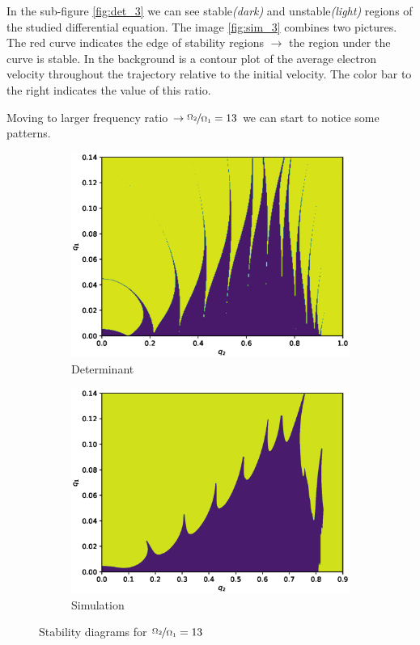 In the sub-figure \ref{fig:det_3} we can see stable\textit{(dark)} and unstable\textit{(light)} regions of the studied differential equation. The image \ref{fig:sim_3} combines two pictures. The red curve indicates the edge of stability regions $\rightarrow$ the region under the curve is stable. In the background is a contour plot of the average electron velocity throughout the trajectory relative to the initial velocity. The color bar to the right indicates the value of this ratio.

Moving to larger frequency ratio $\rightarrow \nicefrac{\Omega_2}{\Omega_1} = 13$ we can start to notice some patterns.

\begin{figure}[H]
\begin{subfigure}{.5\textwidth}
  \centering
  \includegraphics[width=\linewidth]{img/q1_0.0-0.14_q2_0.0-1.0_400x400_13.eps}
  \caption{Determinant}
  \label{fig:det_13}
\end{subfigure}%
\begin{subfigure}{.5\textwidth}
  \centering
  \includegraphics[width=\linewidth]{img/0_ions_1_electrons_q1_0.0-0.14_q2_0.0-0.9_1296x1296_13.eps}  
  \caption{Simulation}
  \label{fig:sim_13}
\end{subfigure}
\caption{Stability diagrams for $\nicefrac{\Omega_2}{\Omega_1} = 13$}
\label{fig:stabil-eta=13}
\end{figure}


